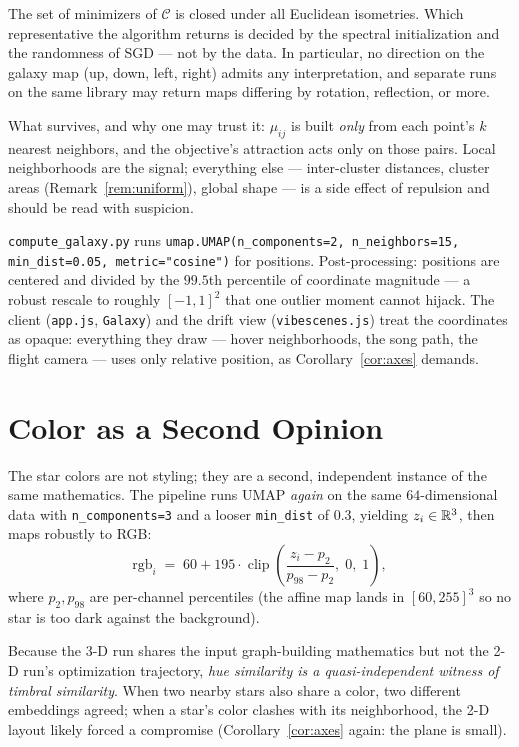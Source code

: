 \begin{corollary}\label{cor:axes}
The set of minimizers of $\mathcal{C}$ is closed under all Euclidean
isometries. Which representative the algorithm returns is decided by the
spectral initialization and the randomness of SGD --- not by the data. In
particular, no direction on the galaxy map (up, down, left, right) admits
any interpretation, and separate runs on the same library may return maps
differing by rotation, reflection, or more.
\end{corollary}

What survives, and why one may trust it: $\mu_{ij}$ is built \emph{only}
from each point's $k$ nearest neighbors, and the objective's attraction acts
only on those pairs. Local neighborhoods are the signal; everything else ---
inter-cluster distances, cluster areas (Remark~\ref{rem:uniform}), global
shape --- is a side effect of repulsion and should be read with suspicion.

\begin{incode}
\texttt{compute\_galaxy.py} runs
\texttt{umap.UMAP(n\_components=2, n\_neighbors=15, min\_dist=0.05,
metric="cosine")} for positions. Post-processing: positions are centered and
divided by the $99.5$th percentile of coordinate magnitude --- a robust
rescale to roughly $[-1,1]^2$ that one outlier moment cannot hijack.
The client (\texttt{app.js}, \texttt{Galaxy}) and the drift view
(\texttt{vibescenes.js}) treat the coordinates as opaque: everything they
draw --- hover neighborhoods, the song path, the flight camera --- uses only
relative position, as Corollary~\ref{cor:axes} demands.
\end{incode}

\section{Color as a Second Opinion}

The star colors are not styling; they are a second, independent instance of
the same mathematics. The pipeline runs UMAP \emph{again} on the same
$64$-dimensional data with \texttt{n\_components=3} and a looser
\texttt{min\_dist} of $0.3$, yielding $z_i \in \mathbb{R}^3$, then maps robustly to
RGB:
\[
\text{rgb}_i \;=\; 60 + 195 \cdot
\operatorname{clip}\!\left(
\frac{z_i - p_2}{p_{98} - p_2},\; 0,\; 1\right),
\]
where $p_2, p_{98}$ are per-channel percentiles (the affine map lands in
$[60, 255]^3$ so no star is too dark against the background).

Because the 3-D run shares the input graph-building mathematics but not the
2-D run's optimization trajectory, \emph{hue similarity is a
quasi-independent witness of timbral similarity}. When two nearby stars also
share a color, two different embeddings agreed; when a star's color clashes
with its neighborhood, the 2-D layout likely forced a compromise
(Corollary~\ref{cor:axes} again: the plane is small).

